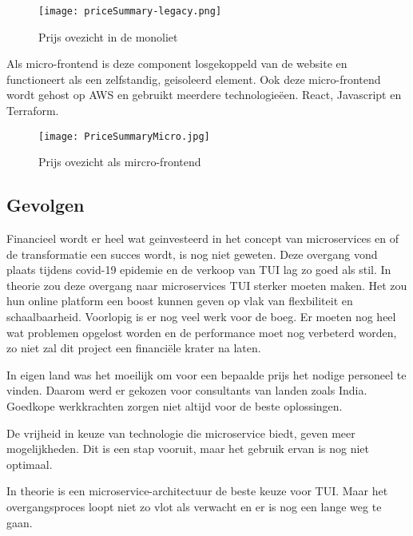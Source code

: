 \begin{figure}[!htb]
    \centering
    \texttt{[image: priceSummary-legacy.png]}
    \caption{Prijs ovezicht in de monoliet \label{pricelegacy}}
\end{figure}

Als micro-frontend is deze component losgekoppeld van de website en functioneert als een zelfstandig, geisoleerd element. Ook deze micro-frontend wordt gehost op AWS en gebruikt meerdere technologieëen. React, Javascript en Terraform.

\begin{figure}[!htb]
    \centering
    \texttt{[image: PriceSummaryMicro.jpg]}
    \caption{Prijs ovezicht als mircro-frontend \label{pricemicro}}
\end{figure}

\subsection{Gevolgen}

Financieel wordt er heel wat geinvesteerd in het concept van microservices en of de transformatie een succes wordt, is nog niet geweten. Deze overgang vond plaats tijdens covid-19 epidemie en de verkoop van TUI lag zo goed als stil. In theorie zou deze overgang naar microservices TUI sterker moeten maken. Het zou hun online platform een boost kunnen geven op vlak van flexbiliteit en schaalbaarheid. Voorlopig is er nog veel werk voor de boeg. Er moeten nog heel wat problemen opgelost worden en de performance moet nog verbeterd worden, zo niet zal dit project een financiële krater na laten.

In eigen land was het moeilijk om voor een bepaalde prijs het nodige personeel te vinden. Daarom werd er gekozen voor consultants van landen zoals India. Goedkope werkkrachten zorgen niet altijd voor de beste oplossingen.  

De vrijheid in keuze van technologie die microservice biedt, geven meer mogelijkheden. Dit is een stap vooruit, maar het gebruik ervan is nog niet optimaal. 

In theorie is een microservice-architectuur de beste keuze voor TUI. Maar het overgangsproces loopt niet zo vlot als verwacht en er is nog een lange weg te gaan.
